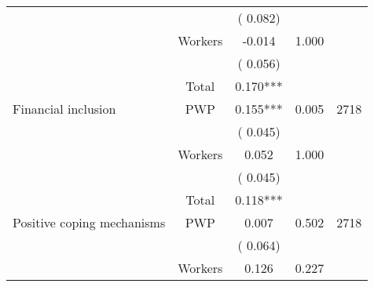\begin{tabular}{l*{4}{c}}
                               &                               &       (       0.082)                              & &                                                                             \\ 
                               &       Workers         &             -0.014                 &        1.000    &                                               \\ 
                               &                               &       (       0.056)                              & &                                                                             \\ 
\cmidrule{2-3}
                               &       Total           &              0.170***                 &    &                                               \\ 
\cmidrule{2-3}
 Financial inclusion                 &       PWP     &              0.155***                 &        0.005    & 2718                               \\ 
                               &                               &       (       0.045)                              & &                                                                             \\ 
                               &       Workers         &              0.052                 &        1.000    &                                               \\ 
                               &                               &       (       0.045)                              & &                                                                             \\ 
\cmidrule{2-3}
                               &       Total           &              0.118***                 &    &                                               \\ 
\cmidrule{2-3}
 Positive coping mechanisms                 &       PWP     &              0.007                 &        0.502    & 2718                               \\ 
                               &                               &       (       0.064)                              & &                                                                             \\ 
                               &       Workers         &              0.126               &        0.227   &                                               \\ 

\end{tabular}
